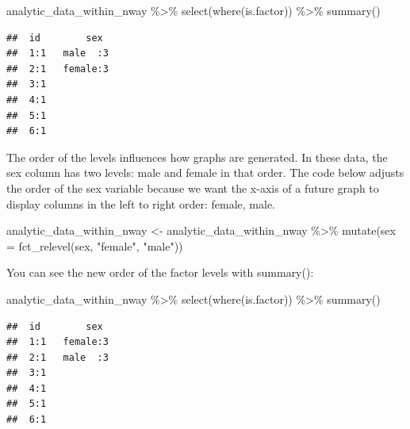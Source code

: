 \documentclass[
]{krantz}
\makeatletter
\newenvironment{Shaded}{\begin{snugshade}}{\end{snugshade}}
\newcommand{\AttributeTok}[1]{\textcolor[rgb]{0.61,0.61,0.61}{#1}}
\newcommand{\FunctionTok}[1]{\textcolor[rgb]{0,0,0}{#1}}
\newcommand{\NormalTok}[1]{#1}
\newcommand{\OtherTok}[1]{\textcolor[rgb]{0.37,0.37,0.37}{#1}}
\newcommand{\SpecialCharTok}[1]{\textcolor[rgb]{0,0,0}{#1}}
\newcommand{\StringTok}[1]{\textcolor[rgb]{0.5,0.5,0.5}{#1}}
\newenvironment{kframe}{%
\medskip{}
\setlength{\fboxsep}{.8em}
 \def\at@end@of@kframe{}%
 \ifinner\ifhmode%
  \def\at@end@of@kframe{\end{minipage}}%
  \begin{minipage}{\columnwidth}%
 \fi\fi%
 \def\FrameCommand##1{\hskip\@totalleftmargin \hskip-\fboxsep
 \colorbox{shadecolor}{##1}\hskip-\fboxsep
     \hskip-\linewidth \hskip-\@totalleftmargin \hskip\columnwidth}%
 \MakeFramed {\advance\hsize-\width
   \@totalleftmargin\z@ \linewidth\hsize
   \@setminipage}}%
 {\par\unskip\endMakeFramed%
 \at@end@of@kframe}
\renewenvironment{Shaded}{\begin{kframe}}{\end{kframe}}
\makeatother
\begin{document}
\begin{Shaded}
\begin{Highlighting}[]
\NormalTok{analytic\_data\_within\_nway }\SpecialCharTok{\%\textgreater{}\%}
  \FunctionTok{select}\NormalTok{(}\FunctionTok{where}\NormalTok{(is.factor)) }\SpecialCharTok{\%\textgreater{}\%}
  \FunctionTok{summary}\NormalTok{()}
\end{Highlighting}
\end{Shaded}

\begin{verbatim}
##  id        sex   
##  1:1   male  :3  
##  2:1   female:3  
##  3:1             
##  4:1             
##  5:1             
##  6:1
\end{verbatim}

The order of the levels influences how graphs are generated. In these data, the sex column has two levels: male and female in that order. The code below adjusts the order of the sex variable because we want the x-axis of a future graph to display columns in the left to right order: female, male.

\begin{Shaded}
\begin{Highlighting}[]
\NormalTok{analytic\_data\_within\_nway }\OtherTok{\textless{}{-}}\NormalTok{ analytic\_data\_within\_nway }\SpecialCharTok{\%\textgreater{}\%}
  \FunctionTok{mutate}\NormalTok{(}\AttributeTok{sex =} \FunctionTok{fct\_relevel}\NormalTok{(sex,}
                           \StringTok{"female"}\NormalTok{,}
                           \StringTok{"male"}\NormalTok{))}
\end{Highlighting}
\end{Shaded}

You can see the new order of the factor levels with summary():

\begin{Shaded}
\begin{Highlighting}[]
\NormalTok{analytic\_data\_within\_nway }\SpecialCharTok{\%\textgreater{}\%}
  \FunctionTok{select}\NormalTok{(}\FunctionTok{where}\NormalTok{(is.factor)) }\SpecialCharTok{\%\textgreater{}\%}
  \FunctionTok{summary}\NormalTok{()}
\end{Highlighting}
\end{Shaded}

\begin{verbatim}
##  id        sex   
##  1:1   female:3  
##  2:1   male  :3  
##  3:1             
##  4:1             
##  5:1             
##  6:1
\end{verbatim}
\end{document}
